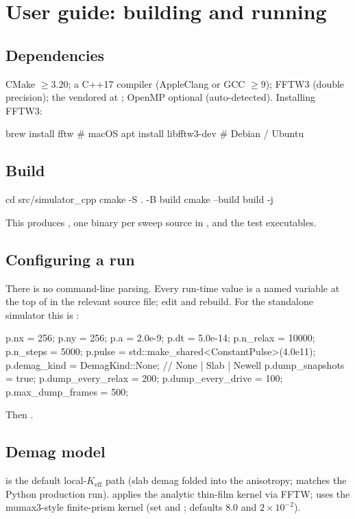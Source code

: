 \documentclass[11pt,a4paper]{article}
\begin{document}
\section{User guide: building and running}

\subsection{Dependencies}
CMake $\geq 3.20$; a C++17 compiler (AppleClang or GCC $\geq 9$); FFTW3
(double precision); the vendored  at ;
OpenMP optional (auto-detected). Installing FFTW3:
\begin{shell}
brew install fftw          # macOS
apt install libfftw3-dev   # Debian / Ubuntu
\end{shell}

\subsection{Build}
\begin{shell}
cd src/simulator_cpp
cmake -S . -B build
cmake --build build -j
\end{shell}
This produces , one binary per sweep source
in , and the test executables.

\subsection{Configuring a run}
There is no command-line parsing. Every run-time value is a named
variable at the top of  in the relevant source file; edit
and rebuild. For the standalone simulator this is
:
\begin{shell}
p.nx = 256;  p.ny = 256;  p.a = 2.0e-9;
p.dt = 5.0e-14;  p.n_relax = 10000;  p.n_steps = 5000;
p.pulse = std::make_shared<ConstantPulse>(4.0e11);
p.demag_kind = DemagKind::None;   // None | Slab | Newell
p.dump_snapshots   = true;
p.dump_every_relax = 200;
p.dump_every_drive = 100;
p.max_dump_frames  = 500;
\end{shell}
Then .

\subsection{Demag model}
 is the default local-$K_{\text{eff}}$ path
(slab demag folded into the anisotropy; matches the Python
 production run).  applies
the analytic thin-film kernel via FFTW;  uses
the mumax3-style finite-prism kernel (set  and
; defaults 8.0 and $2\times10^{-2}$).
\end{document}
